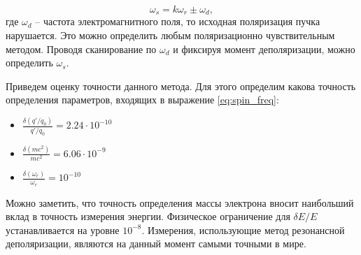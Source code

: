 \begin{equation}
\omega_s=  k\omega_{r} \pm \omega_d,
\end{equation}
где $\omega_d$ -- частота электромагнитного поля, то исходная поляризация пучка нарушается. Это можно определить любым поляризационно чувствительным методом. Проводя сканирование по $\omega_d$ и фиксируя момент деполяризации, можно определить $\omega_s$.
\par Приведем оценку точности данного метода. Для этого определим какова точность определения параметров, входящих в выражение \ref{eq:spin_freq}:
\begin{itemize}
	\item $\displaystyle \frac{\delta (q'/q_0)}{q'/q_0} = 2.24 \cdot 10^{-10} $ \cite{PDG}
	\item $\displaystyle \frac{\delta (mc^2)}{mc^2}= 6.06\cdot10^{-9} $ \cite{PDG}
	\item $\displaystyle \frac{\delta (\omega_r)}{\omega_r} = 10^{-10}$
\end{itemize}
Можно заметить, что точность определения массы электрона вносит наибольший вклад в точность измерения энергии. Физическое ограничение для $\delta E/E$ устанавливается на уровне $10^{-8}$. Измерения, использующие метод резонансной деполяризации, являются на данный момент самыми точными в мире.
